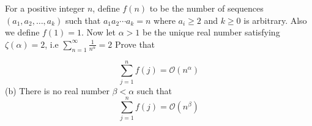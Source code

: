 For a positive integer $n$, define $f(n)$ to be the number of sequences $(a_1,a_2,\dots,a_k)$ such that $a_1a_2\cdots a_k=n$ where $a_i\geq 2$ and $k\ge 0$ is arbitrary. Also we define $f(1)=1$. Now let $\alpha>1$ be the unique real number satisfying $\zeta(\alpha)=2$, i.e $ \sum_{n=1}^{\infty}\frac{1}{n^\alpha}=2 $
Prove that
\begin{itemize}
\end{itemize}
\[ \sum_{j=1}^{n}f(j)=\mathcal{O}(n^\alpha) \]
(b) There is no real number $\beta<\alpha$ such that
\[ \sum_{j=1}^{n}f(j)=\mathcal{O}(n^\beta) \]
